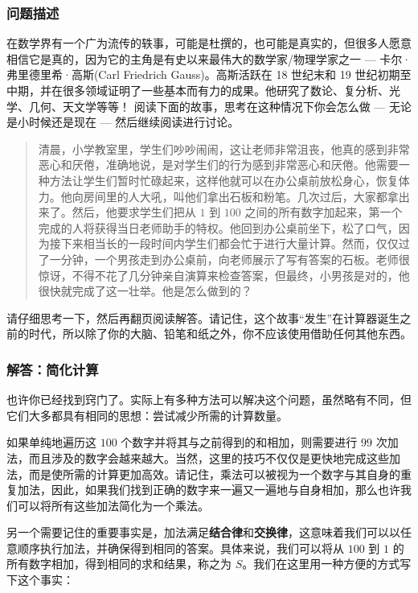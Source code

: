 \subsubsection*{问题描述}

在数学界有一个广为流传的轶事，可能是杜撰的，也可能是真实的，但很多人愿意相信它是真的，因为它的主角是有史以来最伟大的数学家/物理学家之一 --- 卡尔·弗里德里希·高斯(Carl Friedrich Gauss)。高斯活跃在 18 世纪末和 19 世纪初期至中期，并在很多领域证明了一些基本而有力的成果。他研究了数论、复分析、光学、几何、天文学等等！ 阅读下面的故事，思考在这种情况下你会怎么做 --- 无论是小时候还是现在 --- 然后继续阅读进行讨论。

\begin{quote}
    清晨，小学教室里，学生们吵吵闹闹，这让老师非常沮丧，他真的感到非常恶心和厌倦，准确地说，是对学生们的行为感到非常恶心和厌倦。他需要一种方法让学生们暂时忙碌起来，这样他就可以在办公桌前放松身心，恢复体力。他向房间里的人大吼，叫他们拿出石板和粉笔。几次过后，大家都拿出来了。然后，他要求学生们把从 $1$ 到 $100$ 之间的所有数字加起来，第一个完成的人将获得当日老师助手的特权。他回到办公桌前坐下，松了口气，因为接下来相当长的一段时间内学生们都会忙于进行大量计算。然而，仅仅过了一分钟，一个男孩走到办公桌前，向老师展示了写有答案的石板。老师很惊讶，不得不花了几分钟亲自演算来检查答案，但最终，小男孩是对的，他很快就完成了这一壮举。他是怎么做到的？
\end{quote}

请仔细思考一下，然后再翻页阅读解答。请记住，这个故事“发生”在计算器诞生之前的时代，所以除了你的大脑、铅笔和纸之外，你不应该使用借助任何其他东西。

\clearpage

\subsubsection*{解答：简化计算}

也许你已经找到窍门了。实际上有多种方法可以解决这个问题，虽然略有不同，但它们大多都具有相同的思想：尝试减少所需的计算数量。

如果单纯地遍历这 $100$ 个数字并将其与之前得到的和相加，则需要进行 $99$ 次加法，而且涉及的数字会越来越大。当然，这里的技巧不仅仅是更快地完成这些加法，而是使所需的计算更加高效。请记住，乘法可以被视为一个数字与其自身的重复加法，因此，如果我们找到正确的数字来一遍又一遍地与自身相加，那么也许我们可以将所有这些加法简化为一个乘法。

另一个需要记住的重要事实是，加法满足\textbf{结合律}和\textbf{交换律}，这意味着我们可以以任意顺序执行加法，并确保得到相同的答案。具体来说，我们可以将从 $100$ 到 $1$ 的所有数字相加，得到相同的求和结果，称之为 $S$。我们在这里用一种方便的方式写下这个事实：

